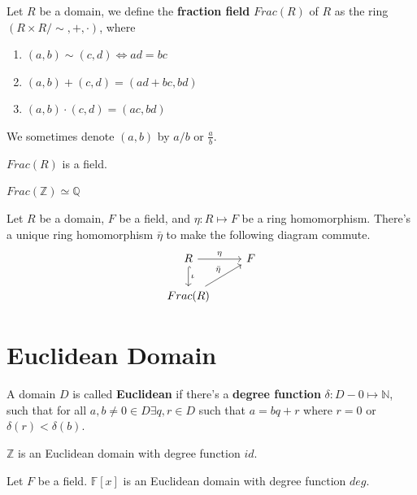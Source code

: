 \documentclass[12pt]{book}
\begin{document}
\begin{definition}
	Let $R$ be a domain, we define the {\bf fraction field} $Frac(R)$ of $R$ as the ring $(R\times R/\sim,+,\cdot)$, where 
	\begin{enumerate}
		\item $(a,b)\sim(c,d)\Leftrightarrow ad=bc$
		\item $(a,b)+(c,d)=(ad+bc,bd)$
		\item $(a,b)\cdot(c,d)=(ac,bd)$
	\end{enumerate}
	We sometimes denote $(a,b)$ by $a/b$ or $\frac ab$.
\end{definition}

\begin{lemma}
	$Frac(R)$ is a field.
\end{lemma}

\begin{example}
	$Frac(\mathbb Z)\simeq \mathbb Q$
\end{example}

\begin{lemma}
	Let $R$ be a domain, $F$ be a field, and $\eta:R\mapsto F$ be a ring homomorphism. There's a unique ring homomorphism $\bar\eta$ to make the following diagram commute.
	\[
	\begin{tikzcd}
		R \arrow{r}{\eta}  \arrow[hook]{d}{\iota}& F\\
		Frac(R) \arrow{ur}{\bar\eta}
	\end{tikzcd}
	\]
	
\end{lemma}

\section{Euclidean Domain}

\begin{definition}
	A domain $D$ is called {\bf Euclidean} if there's a {\bf degree function} $\delta: D-0\mapsto \mathbb N$, such that for all $a,b\neq 0\in D\exists q,r\in D$ such that $a=bq+r$ where $r=0$ or $\delta(r)<\delta(b)$.
\end{definition}

\begin{example}
	$\mathbb Z$ is an Euclidean domain with degree function $id$.
\end{example}

\begin{example}
	Let $F$ be a field. $\mathbb F[x]$ is an Euclidean domain with degree function $deg$.
\end{example}
\end{document}
